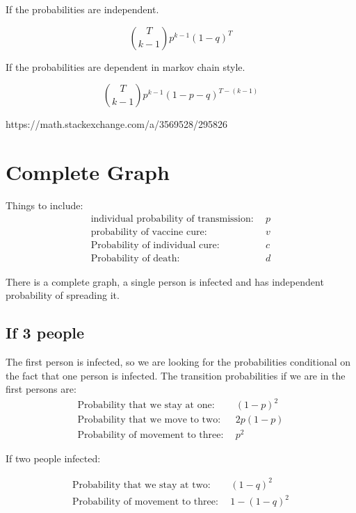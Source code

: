 \documentclass[12pt]{report}
\numberwithin{equation}{section}
\begin{document}
If the probabilities are independent. 

\begin{equation}
\binom{T}{k-1}p^{k-1}(1-q)^T
\end{equation}

If the probabilities are dependent in markov chain style. 

\begin{equation}
\binom{T}{k-1}p^{k-1} (1-p-q)^{T-(k-1)}
\end{equation}

https://math.stackexchange.com/a/3569528/295826



\section{Complete Graph }

Things to include: 
\begin{align}
\text{individual probability of transmission:}& ~~p \\
\text{probability of vaccine cure:}& ~~v \\
\text{Probability of individual cure:}& ~~c \\
\text{Probability of death:}& ~~d
\end{align}

There is a complete graph, a single person is infected and has independent probability of spreading it. 

\subsection{If 3 people}

The first person is infected, so we are looking for the probabilities conditional on the fact that one person is infected. The transition probabilities if we are in the first persons are:
\begin{align}
\text{Probability that we stay at one:}& ~~(1-p)^2 \\
\text{Probability that we move to two:}&~~ 2p(1-p) \\
\text{Probability of movement to three:}& ~~p^2
\end{align}

If two people infected:

\begin{align} 
\text{Probability that we stay at two:}& ~~(1-q)^2 \\
\text{Probability of movement to three:}& ~~1-(1-q)^2
\end{align}
\end{document}

